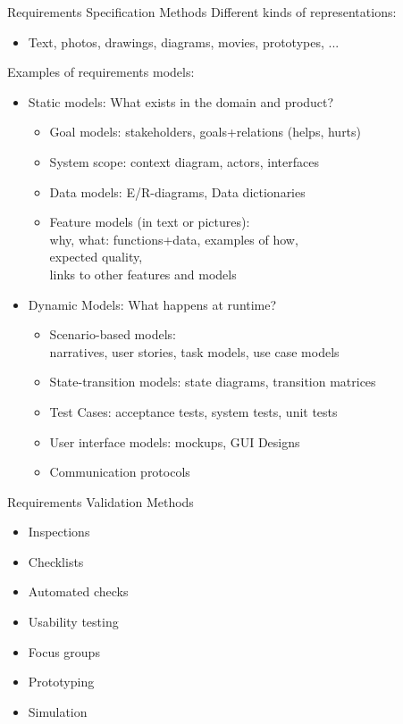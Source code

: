 \documentclass{simpleslides}
\begin{document}
\begin{frame}[fragile]{Requirements Specification Methods}
Different kinds of representations:
\begin{itemize}
\item Text, photos, drawings, diagrams, movies, prototypes, ...
\end{itemize}
Examples of requirements models:
\begin{itemize}
\item Static models: What exists in the domain and product?
\begin{itemize}
\item Goal models: stakeholders, goals+relations (helps, hurts)
\item System scope: context diagram, actors, interfaces
\item Data models: E/R-diagrams, Data dictionaries
\item Feature models (in text or pictures):\\why, what: functions+data, examples of how,\\expected quality,\\links to other features and models
\end{itemize}
\item Dynamic Models: What happens at runtime?
\begin{itemize}
\item Scenario-based models:\\narratives, user stories, task models, use case models
\item State-transition models: state diagrams, transition matrices
\item Test Cases: acceptance tests, system tests, unit tests
\item User interface models: mockups, GUI Designs
\item Communication protocols
\end{itemize}
\end{itemize}
\end{frame}

\begin{frame}[fragile]{Requirements Validation Methods}
\begin{itemize}
\item Inspections
\item Checklists
\item Automated checks
\item Usability testing
\item Focus groups
\item Prototyping
\item Simulation
\end{itemize}
\end{frame}
  
\end{document}
